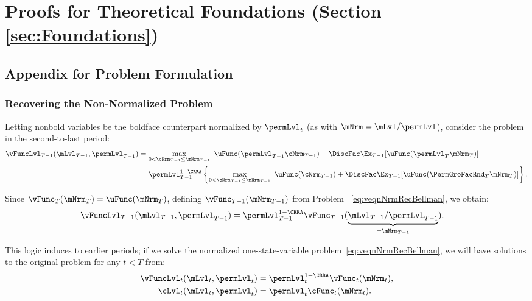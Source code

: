 \documentclass[\econtexRoot/BufferStockTheory]{subfiles}
\begin{document}
\section{Proofs for Theoretical Foundations (Section \ref{sec:Foundations})}

\subsection{Appendix for Problem Formulation}

\subsubsection{Recovering the Non-Normalized Problem}\label{sec:recoverLevels}
Letting nonbold variables be the boldface counterpart normalized by $\permLvl_{t}$ (as with $\mNrm=\mLvl/\permLvl$), consider the problem in the second-to-last period:
\begin{equation}\label{eq:vBold}
  \begin{split}
    \vFuncLvl_{T-1}(\mLvl_{T-1},\permLvl_{T-1})
    & =  \max_{0< \cNrm_{T-1}\leq \mNrm_{T-1}}~
    \uFunc(\permLvl_{T-1}\cNrm_{T-1}) + \DiscFac  \Ex_{T-1} [\uFunc(\permLvl_{T}{\mNrm}
    _{T})]  \\
    & = \permLvl_{T-1}^{1-\CRRA}
    \left\{\max_{0<\cNrm_{T-1}\leq \mNrm_{T-1}}~ \uFunc(\cNrm_{T-1}) + \DiscFac \Ex_{T-1} [ \uFunc( {\PermGroFacRnd}_{T}
      {\mNrm}_{T}) ] \right\}.
  \end{split}
\end{equation}

\hypertarget{The-Related-Problem}{}

Since $\vFunc_{T}(\mNrm_{T}) = \uFunc(\mNrm_{T})$, defining $\vFunc_{T-1}(\mNrm_{T-1})$ from Problem ~\eqref{eq:veqnNrmRecBellman}, we obtain:
\begin{align*}
  \vFuncLvl_{T-1}(\mLvl_{T-1},\permLvl_{T-1})  & = \permLvl_{T-1}^{1-\CRRA} \vFunc_{T-1}(\underbrace{\mLvl_{T-1}/\permLvl_{T-1}}_{=\mNrm_{T-1}}).
\end{align*}

This logic induces to earlier periods; if we solve the normalized one-state-variable problem~\eqref{eq:veqnNrmRecBellman}, we will have solutions to the original problem for any $t<T$ from:
\begin{align*}
  \vFuncLvl_{t}(\mLvl_{t},\permLvl_{t})  & = \permLvl_{t}^{1-\CRRA}\vFunc_{t}(\mNrm_{t}),
  \\ \cLvl_{t}(\mLvl_{t},\permLvl_{t})  & = \permLvl_{t}\cFunc_{t}(\mNrm_{t}).
\end{align*}
\end{document}
